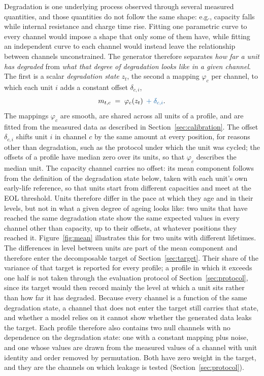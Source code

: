 \documentclass{article}
\newif\ifreview \reviewtrue        %
\newcommand{\rev}[1]{\ifreview\textcolor[HTML]{0B5FA5}{#1}\else#1\fi}
\newcommand{\revwhy}[1]{\ifreview\marginpar{\footnotesize\raggedright\textcolor[HTML]{0B5FA5}{#1}}\fi}
\begin{document}
Degradation is one underlying process observed through several measured quantities, and those quantities do not follow the same shape: e.g., capacity falls while internal resistance and charge time rise. Fitting one parametric curve to every channel would impose a shape that only some of them have, while fitting an independent curve to each channel would instead leave the relationship between channels unconstrained. The generator therefore separates \emph{how far a unit has degraded} from \emph{what that degree of degradation looks like in a given channel}. The first is a scalar \emph{degradation state} $z_t$, the second a mapping $\varphi_c$ per channel\rev{, to which each unit $i$ adds a constant offset $\delta_{c,i}$},
\begin{equation}
  m_{t,c} \;=\; \varphi_c\!\left(z_t\right) \rev{\;+\; \delta_{c,i}}.
  \label{eq:mean}
\end{equation}
The mappings $\varphi_c$ are smooth, are shared across all units of a profile, and are fitted from the measured data as described in Section~\ref{sec:calibration}. \rev{The offset $\delta_{c,i}$ shifts unit $i$ in channel $c$ by the same amount at every position, for reasons other than degradation, such as the protocol under which the unit was cycled; the offsets of a profile have median zero over its units, so that $\varphi_c$ describes the median unit. The capacity channel carries no offset: its mean component follows from the definition of the degradation state below, taken with each unit's own early-life reference, so that units start from different capacities and meet at the EOL threshold.} Units therefore differ in the pace at which they age \rev{and in their levels,} but not in what a given degree of ageing looks like: two units that have reached the same degradation state show the same expected values in every channel \rev{other than capacity, up to their offsets}, at whatever positions they reached it.\revwhy{X2: per-unit offsets} Figure~\ref{fig:mean} illustrates this for two units with different lifetimes. \rev{The differences in level between units are part of the mean component and therefore enter the decomposable target of Section~\ref{sec:target}. Their share of the variance of that target is reported for every profile; a profile in which it exceeds one half is not taken through the evaluation protocol of Section~\ref{sec:protocol}, since its target would then record mainly the level at which a unit sits rather than how far it has degraded.}\revwhy{X2, X6: offset share of $y$ bounded} \rev{Because every channel is a function of the same degradation state, a channel that does not enter the target still carries that state, and whether a model relies on it cannot show whether the generated data leaks the target. Each profile therefore also contains two null channels with no dependence on the degradation state: one with a constant mapping plus noise, and one whose values are drawn from the measured values of a channel with unit identity and order removed by permutation. Both have zero weight in the target, and they are the channels on which leakage is tested (Section~\ref{sec:protocol}).}\revwhy{C2: null channels separate leakage from redundancy}
 
\end{document}
